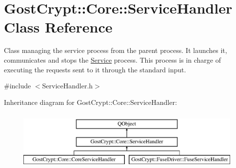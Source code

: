 \hypertarget{class_gost_crypt_1_1_core_1_1_service_handler}{}\section{Gost\+Crypt\+:\+:Core\+:\+:Service\+Handler Class Reference}
\label{class_gost_crypt_1_1_core_1_1_service_handler}


Class managing the service process from the parent process. It launches it, communicates and stops the \hyperlink{class_gost_crypt_1_1_core_1_1_service}{Service} process. This process is in charge of executing the requests sent to it through the standard input.  




{\ttfamily \#include $<$Service\+Handler.\+h$>$}

Inheritance diagram for Gost\+Crypt\+:\+:Core\+:\+:Service\+Handler\+:\begin{figure}[H]
\begin{center}
\leavevmode
\includegraphics[height=3.000000cm]{class_gost_crypt_1_1_core_1_1_service_handler}
\end{center}
\end{figure}
